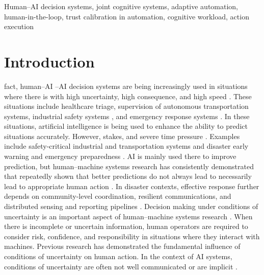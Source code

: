\documentclass[journal]{IEEEtran}
\theoremstyle{plain}
\theoremstyle{definition}
\providecommand{\DIFaddtex}[1]{{\protect\color{blue} \sf #1}} %
\providecommand{\DIFdeltex}[1]{{\protect\color{red} \scriptsize #1}} %
\providecommand{\DIFaddbegin}{} %
\providecommand{\DIFaddend}{} %
\providecommand{\DIFdelbegin}{} %
\providecommand{\DIFdelend}{} %
\providecommand{\DIFadd}[1]{\texorpdfstring{\DIFaddtex{#1}}{#1}} %
\providecommand{\DIFdel}[1]{\texorpdfstring{\DIFdeltex{#1}}{}} %
\newcommand{\DIFscaledelfig}{0.5}
\newlength{\DIFdelgraphicswidth} %
\newlength{\DIFdelgraphicsheight} %
\newcommand{\DIFaddincludegraphics}[2][]{{\color{blue}\fbox{\DIFOincludegraphics[#1]{#2}}}} %
\newcommand{\DIFdelincludegraphics}[2][]{%
\sbox{\DIFdelgraphicsbox}{\DIFOincludegraphics[#1]{#2}}%
\settoboxwidth{\DIFdelgraphicswidth}{\DIFdelgraphicsbox} %
\settoboxtotalheight{\DIFdelgraphicsheight}{\DIFdelgraphicsbox} %
\scalebox{\DIFscaledelfig}{%
\parbox[b]{\DIFdelgraphicswidth}{\usebox{\DIFdelgraphicsbox}\\[-\baselineskip] \rule{\DIFdelgraphicswidth}{0em}}\llap{\resizebox{\DIFdelgraphicswidth}{\DIFdelgraphicsheight}{%
\setlength{\unitlength}{\DIFdelgraphicswidth}%
\begin{picture}(1,1)%
\thicklines\linethickness{2pt} %
{\color[rgb]{1,0,0}\put(0,0){\framebox(1,1){}}}%
{\color[rgb]{1,0,0}\put(0,0){\line( 1,1){1}}}%
{\color[rgb]{1,0,0}\put(0,1){\line(1,-1){1}}}%
\end{picture}%
}\hspace*{3pt}}} %
} %
\DeclareRobustCommand{\DIFaddbegin}{\DIFOaddbegin \let\includegraphics\DIFaddincludegraphics} %
\DeclareRobustCommand{\DIFaddend}{\DIFOaddend \let\includegraphics\DIFOincludegraphics} %
\DeclareRobustCommand{\DIFdelbegin}{\DIFOdelbegin \let\includegraphics\DIFdelincludegraphics} %
\DeclareRobustCommand{\DIFdelend}{\DIFOaddend \let\includegraphics\DIFOincludegraphics} %
\begin{document}
    \begin{IEEEkeywords}
        Human--AI decision systems, \DIFaddbegin \DIFadd{joint cognitive systems, adaptive automation, }\DIFaddend human-in-the-loop, trust \DIFdelbegin \DIFdel{calibration}\DIFdelend \DIFaddbegin \DIFadd{in automation}\DIFaddend , cognitive workload, action execution
    \end{IEEEkeywords}

\section{Introduction}
\DIFdelbegin %
\DIFdel{fact, human--AI }\DIFdelend \DIFaddbegin {}\DIFadd{--AI }\DIFaddend decision systems are \DIFdelbegin \DIFdel{being }\DIFdelend \DIFaddbegin \DIFadd{increasingly }\DIFaddend used in situations \DIFdelbegin \DIFdel{where there is }\DIFdelend \DIFaddbegin \DIFadd{with }\DIFaddend high uncertainty, high \DIFdelbegin \DIFdel{consequence, and high speed \cite{Bach2024Access,PerezCerrolaza2024CSUR,Yang2022THMSReview}. These situations include healthcare triage, supervision of autonomous transportation systems, industrial safety systems , and emergency response systems \cite{Birkmann2013NatHazards,Sandoval2023IJDRS,Rokhideh2025IJDRS,Rao2024IJDRS,Charan2024,lim2026generativeaidrivenreliabilitylayer}. In these situations, artificial intelligence is being used to enhance the ability to predict situations accurately. However, }\DIFdelend \DIFaddbegin \DIFadd{stakes, and severe time pressure \cite{Bach2024Access,PerezCerrolaza2024CSUR,Yang2022THMSReview}. Examples include safety-critical industrial and transportation systems \cite{Bach2024Access,PerezCerrolaza2024CSUR} and disaster early warning and emergency preparedness \cite{Rokhideh2025IJDRS,Rao2024IJDRS,lim2026generativeaidrivenreliabilitylayer}. AI is mainly used there to improve prediction, but }\DIFaddend human--machine systems research has \DIFdelbegin \DIFdel{consistently demonstrated that }\DIFdelend \DIFaddbegin \DIFadd{repeatedly shown that better }\DIFaddend predictions do not \DIFdelbegin \DIFdel{always lead to }\DIFdelend \DIFaddbegin \DIFadd{necessarily lead to appropriate }\DIFaddend human action \cite{Lai2023FAccT,Muller2022CHIWORK,Hodgson2013THMS}.
\DIFdelbegin \DIFdel{In disaster contexts, effective response further depends on community-level coordination, resilient communications, and distributed sensing and reporting pipelines \cite{Stephens2022SIGDOC,Longo2025PMC,Yang2005MobiHoc}.
Decision making under conditions of uncertainty is an important aspect of human--machine systems research \cite{Yang2022THMSReview,Bach2024Access,lim2026generativeaidrivenreliabilitylayer}. When there is incomplete or uncertain information, human operators are required to consider risk, confidence, and responsibility in situations where they interact with machines. Previous research has demonstrated the fundamental influence of conditions of uncertainty on human action. In the context of AI systems, conditions of uncertainty are often not well communicated or are implicit \cite{McAllister2017IJCAI,Weidinger2022FAccT,Miller2019XRDS}.
}\DIFdelend 
\end{document}
